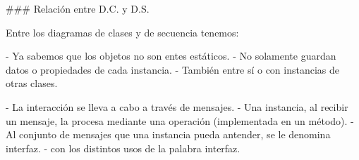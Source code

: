 ### Relación entre D.C. y D.S.

Entre los diagramas de clases y de secuencia tenemos:

- Ya sabemos que los objetos no son entes estáticos.
    - No solamente guardan datos o propiedades de cada instancia.
    - También  entre sí o con instancias de otras clases.

- La interacción se lleva a cabo a través de \alert{mensajes}.
    - Una instancia, al recibir un mensaje, la procesa mediante una operación (implementada en
    un método).
    - Al conjunto de mensajes que una instancia pueda antender, se le denomina \alert{interfaz}.
        -  con los distintos usos de la palabra interfaz.
